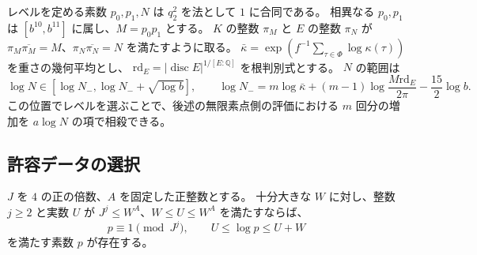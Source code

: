 レベルを定める素数 \(p_0,p_1,N\) は \(q_2^2\) を法として \(1\) に合同である。
相異なる \(p_0,p_1\) は \([b^{10},b^{11}]\) に属し、\(M=p_0p_1\) とする。
\(K\) の整数 \(\pi_M\) と \(E\) の整数 \(\pi_N\) が
\(\pi_M\overline{\pi_M}=M\)、\(\pi_N\overline{\pi_N}=N\) を満たすように取る。
\(\bar\kappa=\exp(f^{-1}\sum_{\tau\in\Phi}\log\kappa(\tau))\) を重さの幾何平均とし、
\(\mathrm{rd}_E=|\operatorname{disc} E|^{1/[E:\mathbb Q]}\) を根判別式とする。
\(N\) の範囲は
\begin{equation}\label{eq:level-window}
 \log N\in[\log N_-,\log N_-+\sqrt{\log b}],\qquad
 \log N_-=
 m\log\bar\kappa+(m-1)\log\frac{M\mathrm{rd}_E}{2\pi}
 -\frac{15}{2}\log b.
\end{equation}
この位置でレベルを選ぶことで、後述の無限素点側の評価における
\(m\) 回分の増加を \(a\log N\) の項で相殺できる。

\subsection{許容データの選択}

\begin{lemma}[対数区間の素数]\label{lem:log-window-prime}
\(J\) を \(4\) の正の倍数、\(A\) を固定した正整数とする。
十分大きな \(W\) に対し、整数 \(j\ge2\) と実数 \(U\) が
\(J^j\le W^A\)、\(W\le U\le W^A\) を満たすならば、
\[
 p\equiv1\pmod{J^j},\qquad U\le\log p\le U+W
\]
を満たす素数 \(p\) が存在する。
\end{lemma}

